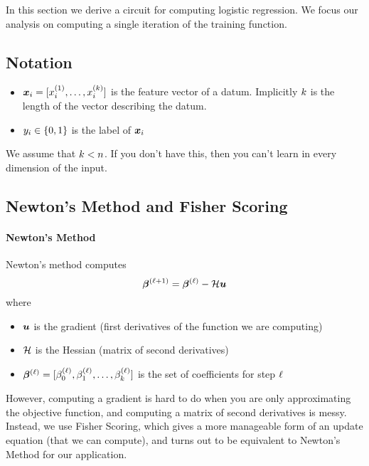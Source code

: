 In this section we derive a circuit for computing logistic regression.
We focus our analysis on computing a single iteration of the training function.


\subsection{Notation}
\begin{itemize}
	\item $\point{i} = [\datum{i}^{(1)} ,\ldots, \datum{i}^{(\featurelen)}]$ is the feature vector of a datum. Implicitly $k$ is the length of the vector describing the datum.
	\item $y_{i} \in \{ 0,1\}$ is the label of $\point{i}$

\end{itemize}

We assume that $k < n$. If you don't have this, then you can't learn in every dimension of the input.


\subsection{Newton's Method and Fisher Scoring}

\paragraph{Newton's Method}

Newton's method computes
\begin{equation}
	\coefficients{\step+1} = \coefficients{\step} - \hessian \gradient
\end{equation}
where
\begin{itemize}
	\item $\gradient$ is the gradient (first derivatives of the function we are computing)
	\item $\mathcal{H}$ is the Hessian (matrix of second derivatives)
	\item $\coefficients{\step} = [ \coeff_{0}^{(\step)}, \coeff_{1}^{(\step)},\ldots, \coeff_{\featurelen}^{(\step)} ]$ is the set of coefficients for step $\ell$
\end{itemize}

However, computing a gradient is hard to do when you are only approximating the objective function, and computing a matrix of second derivatives is messy. Instead, we use Fisher Scoring, which gives a more manageable form of an update equation (that we can compute), and turns out to be equivalent to Newton's Method for our application.

